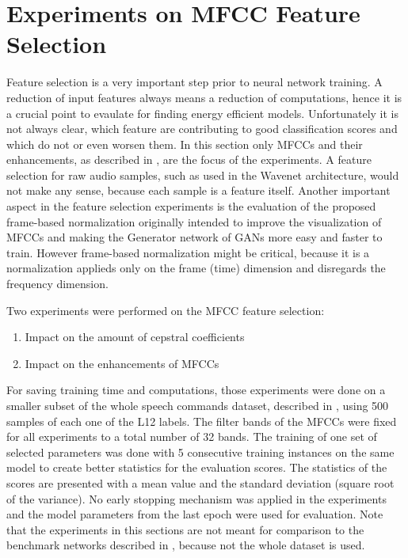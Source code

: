 
\section{Experiments on MFCC Feature Selection}\label{sec:exp_fs}
\thesisStateReady
Feature selection is a very important step prior to neural network training.
A reduction of input features always means a reduction of computations, hence it is a crucial point to evaulate for finding energy efficient models.
Unfortunately it is not always clear, which feature are contributing to good classification scores and which do not or even worsen them.
In this section only MFCCs and their enhancements, as described in , are the focus of the experiments.
A feature selection for raw audio samples, such as used in the Wavenet architecture, would not make any sense, because each sample is a feature itself.
Another important aspect in the feature selection experiments is the evaluation of the proposed frame-based normalization  originally intended to improve the visualization of MFCCs and making the Generator network of GANs more easy and faster to train.
However frame-based normalization might be critical, because it is a normalization applieds only on the frame (time) dimension and disregards the frequency dimension.

Two experiments were performed on the MFCC feature selection:
\begin{enumerate}
    \item Impact on the amount of cepstral coefficients
    \item Impact on the enhancements of MFCCs
\end{enumerate}
For saving training time and computations, those experiments were done on a smaller subset of the whole speech commands dataset, described in , using 500 samples of each one of the L12 labels.
The filter bands of the MFCCs were fixed for all experiments to a total number of 32 bands.
The training of one set of selected parameters was done with 5 consecutive training instances on the same model to create better statistics for the evaluation scores.
The statistics of the scores are presented with a mean value and the standard deviation (square root of the variance).
No early stopping mechanism was applied in the experiments and the model parameters from the last epoch were used for evaluation.
Note that the experiments in this sections are not meant for comparison to the benchmark networks described in , because not the whole dataset is used.


